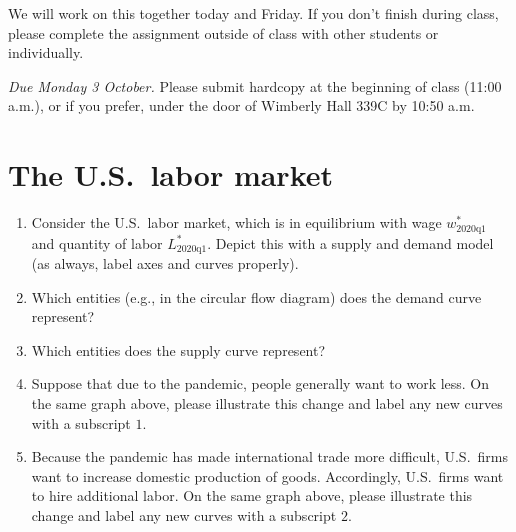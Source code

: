 \documentclass{assignment}
\date{Wednesday 28 September 2022}
\begin{document}
\RaggedRight

\beginassignment{}

We will work on this together today and Friday. If you don't finish during class, please complete the assignment outside of class with other students or individually.

\emph{Due Monday 3 October.} Please submit hardcopy at the beginning of class (11:00 a.m.), or if you prefer, under the door of Wimberly Hall 339C by 10:50 a.m.

\section*{The U.S.~labor market}

\begin{enumerate}

\item Consider the U.S.~labor market, which is in equilibrium with wage $w^*_\text{2020q1}$ and quantity of labor $L^*_\text{2020q1}$. Depict this with a supply and demand model (as always, label axes and curves properly).

\begin{center}
\end{center}

\item Which entities (e.g., in the circular flow diagram) does the demand curve represent?

\vfill

\item Which entities does the supply curve represent?

\vfill

\item Suppose that due to the pandemic, people generally want to work less. On the same graph above, please illustrate this change and label any new curves with a subscript $1$.

\item Because the pandemic has made international trade more difficult, U.S.~firms want to increase domestic production of goods. Accordingly, U.S.~firms want to hire additional labor. On the same graph above, please illustrate this change and label any new curves with a subscript $2$.


\end{enumerate}
\end{document}
